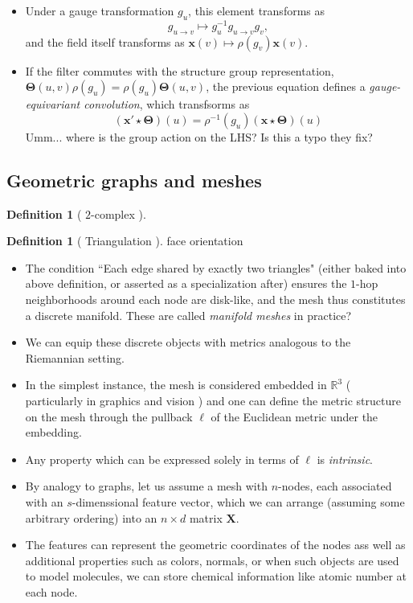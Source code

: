 \documentclass[12pt]{article}
\numberwithin{equation}{section}
\theoremstyle{definition}
\newtheorem{defn}[thm]{Definition}
\newcommand{		\1		}	{	\bm{1}					}%
\begin{document}
\begin{itemize}
\item Under a gauge transformation $g_u$, this element transforms as 
$$
g_{u \to v} \mapsto g_u^{-1} g_{u \to v} g_v,
$$
and the field itself transforms as $\mathbf{x}(v) \mapsto \rho(g_v) \mathbf{x}(v)$. 

\item If the filter commutes with the structure group representation, $\mathbf{\Theta} (u,v) \rho(g_u) = \rho(g_u) \mathbf{\Theta}(u,v)$, the previous equation defines a \emph{gauge-equivariant convolution}, which transfsorms as
$$
( \mathbf{x}' \star \mathbf{\Theta} ) (u) = \rho^{-1} (g_u) ( \mathbf{x} \star \mathbf{\Theta} ) (u)
$$
Umm... where is the group action on the LHS? Is this a typo they fix?
\end{itemize}

\subsection{Geometric graphs and meshes} 

\begin{defn}[ $2$-complex ] 

\end{defn}

\begin{defn}[ Triangulation ]  face orientation
\end{defn}

\begin{itemize}
\item The condition ``Each edge shared by exactly two triangles" (either baked into above definition, or asserted as a specialization after) ensures the $1$-hop neighborhoods around each node are disk-like, and the mesh thus constitutes a discrete manifold. These are called \emph{manifold meshes} in practice?
\item We can equip these discrete objects with metrics analogous to the Riemannian setting. 
\item In the simplest instance, the mesh is considered embedded in $\mathbb{R}^3$ ( particularly in graphics and vision )  and one can define the metric structure on the mesh through the pullback $\ell$ of the Euclidean metric under the embedding. 
\item Any property which can be expressed solely in terms of $\ell$ is \emph{intrinsic}.
\item By analogy to graphs, let us assume a mesh with $n$-nodes, each associated with an $s$-dimenssional feature vector, which we can arrange (assuming some arbitrary ordering) into an $n \times d$ matrix $\mathbf{X}$.
\item The features can represent the geometric coordinates of the nodes ass well as additional properties such as colors, normals, or when such objects are used to model molecules, we can store chemical information like atomic number at each node.
\end{itemize}
\end{document}
